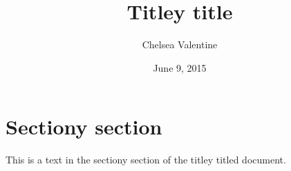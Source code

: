 \documentclass[a4paper, 11pt]{article}
\begin{document}
\title{Titley title}
\author{Chelsea Valentine}
\date{June 9, 2015}
\maketitle
\section{Sectiony section}
This is a text in the sectiony section of the titley titled document.
\end{document}
